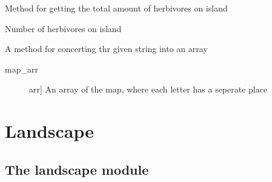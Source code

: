 \documentclass[a4paper,10pt,english]{sphinxmanual}
\begin{document}
\begin{fulllineitems}
\begin{fulllineitems}
\end{fulllineitems}


\begin{fulllineitems}
\label{\detokenize{island:biosim.island.Island.number_of_herbivores_island}}
Method for getting the total amount of herbivores on island

Number of herbivores on island

\end{fulllineitems}


\begin{fulllineitems}
\label{\detokenize{island:biosim.island.Island.string_to_array}}
A method for concerting thr given string into an array
\begin{description}
\item[{map\_arr}] \leavevmode{[}arr{]}
An array of the map, where each letter has a seperate place

\end{description}

\end{fulllineitems}


\end{fulllineitems}



\chapter{Landscape}
\label{\detokenize{landscape::doc}}\label{\detokenize{landscape:landscape}}

\section{The landscape module}
\label{\detokenize{landscape:the-landscape-module}}\label{\detokenize{landscape:module-biosim.landscape}}
\end{document}
